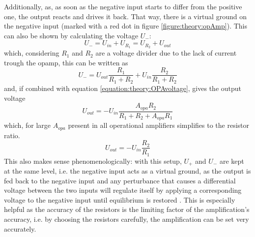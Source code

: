                 Additionally, as, as soon as the negative input starts to differ from the positive one, the output reacts and drives it back. That way, there is a virtual ground on the negative input (marked with a red dot in figure \ref{figure:theory:opAmp}).
                This can also be shown by calculating the voltage $U_-$:
                \begin{equation}
                    U_- = U_{in} + U_{R_1} = U_{R_2} + U_{out}
                \end{equation}
                which, considering $R_1$ and $R_2$ are a voltage divider due to the lack of current trough the opamp, this can be written as
                \begin{equation}
                    U_{-} = U_{out} \frac{R_1}{R_1+R_2} + U_{in} \frac{R_2}{R_1+R_2}
                \end{equation}
                and, if combined with equation \ref{equation:theory:OPAvoltage}, gives the output voltage
                \begin{equation}
                    U_{out} = -U_{in} \frac{A_{opa}R_2}{R_1+R_2 + A_{opa}R_1}
                \end{equation}
                which, for large $A_{opa}$ present in all operational amplifiers simplifies to the resistor ratio.
                \begin{equation}
                    U_{out} = -U_{in}\frac{R_2}{R_1}
                \end{equation}
                This also makes sense phenomenologically: with this setup, $U_{+}$ and $U_{-}$ are kept at the same level, i.e. the negative input acts as a virtual ground, as the output is fed back to the negative input and any perturbance that causes a differential voltage between the two inputs will regulate itself by applying a corresponding voltage to the negative input until equilibrium is restored \cite{huijsing_operational_2017-1}.
                This is especially helpful as the accuracy of the resistors is the limiting factor of the amplification's accuracy, i.e. by choosing the resistors carefully, the amplification can be set very accurately.
